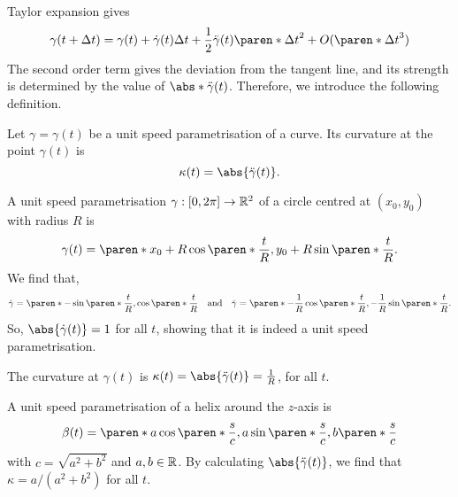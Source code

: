 \documentclass[11pt]{penrose}
\newcommand{\keyword}[1]{\textsf{#1}}
\begin{document}
Taylor expansion gives
\begin{equation}
    \gamma(t + \Delta t)
    = \gamma(t) + \dot{\gamma}(t) \Delta t + \frac{1}{2} \ddot{\gamma}(t) \paren*{\Delta t}^2
    + O(\paren*{\Delta t}^3)
\end{equation}
The second order term gives the deviation from the tangent line, and its strength is determined by the value of $\abs*{\ddot{\gamma}(t)}$. Therefore, we introduce the following definition.

\begin{ndfn}
    Let $\gamma = \gamma(t)$ be a unit speed parametrisation of a curve. Its \keyword{curvature} at the point $\gamma(t)$ is
    \begin{equation}
        \kappa(t) = \abs{\ddot{\gamma}(t)}.
        \label{eq:curvature-dfn}
    \end{equation}
\end{ndfn}

\begin{egg}
    A unit speed parametrisation $\gamma : [0, 2\pi] \to \mathbb{R}^2$ of a circle centred at $(x_0, y_0)$ with radius $R$ is
    \begin{equation}
        \gamma(t) = \paren*{ x_0 + R \cos\paren*{ \frac{t}{R} }, y_0 + R \sin\paren*{ \frac{t}{R} } }.
    \end{equation}
    We find that,
    \begin{equation}
        \dot{\gamma} = \paren*{ -\sin\paren*{ \frac{t}{R} }, \cos\paren*{ \frac{t}{R} } }
        \quad\text{and}\quad
        \ddot{\gamma} = \paren*{ -\frac{1}{R} \cos\paren*{ \frac{t}{R} }, -\frac{1}{R} \sin\paren*{ \frac{t}{R} } }.
    \end{equation}
    So, $\abs{\dot{\gamma}(t)} = 1$ for all $t$, showing that it is indeed a unit speed parametrisation.

    The curvature at $\gamma(t)$ is $\kappa(t) = \abs{\ddot{\gamma}(t)} = \frac{1}{R}$, for all $t$.
\end{egg}

\begin{egg}
    A unit speed parametrisation of a helix around the $z$-axis is
    \begin{equation}
        \beta(t) = \paren*{ a \cos\paren*{\frac{s}{c}}, a \sin\paren*{\frac{s}{c}}, b\paren*{\frac{s}{c}} }
    \end{equation}
    with $c = \sqrt{a^2 + b^2}$ and $a, b \in \mathbb{R}$. By calculating $\abs{\ddot{\gamma}(t)}$, we find that $\kappa = a / (a^2 + b^2)$ for all $t$.
\end{egg}
\end{document}
